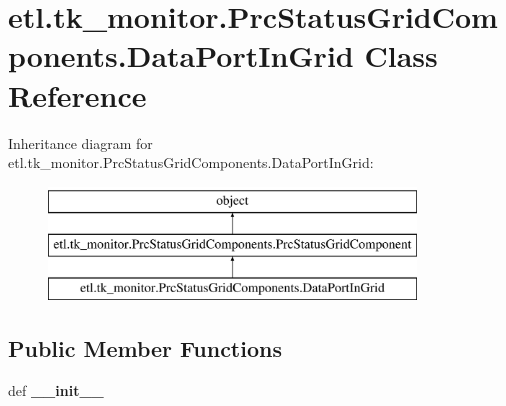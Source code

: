 \hypertarget{classetl_1_1tk__monitor_1_1PrcStatusGridComponents_1_1DataPortInGrid}{\section{etl.\-tk\-\_\-monitor.\-Prc\-Status\-Grid\-Components.\-Data\-Port\-In\-Grid Class Reference}
\label{classetl_1_1tk__monitor_1_1PrcStatusGridComponents_1_1DataPortInGrid}
}
Inheritance diagram for etl.\-tk\-\_\-monitor.\-Prc\-Status\-Grid\-Components.\-Data\-Port\-In\-Grid\-:\begin{figure}[H]
\begin{center}
\leavevmode
\includegraphics[height=3.000000cm]{classetl_1_1tk__monitor_1_1PrcStatusGridComponents_1_1DataPortInGrid}
\end{center}
\end{figure}
\subsection*{Public Member Functions}
\begin{DoxyCompactItemize}
\item 
\hypertarget{classetl_1_1tk__monitor_1_1PrcStatusGridComponents_1_1DataPortInGrid_a3cb0353b45a094855969e8dc524005b4}{def {\bfseries \-\_\-\-\_\-init\-\_\-\-\_\-}}\label{classetl_1_1tk__monitor_1_1PrcStatusGridComponents_1_1DataPortInGrid_a3cb0353b45a094855969e8dc524005b4}

\end{DoxyCompactItemize}
